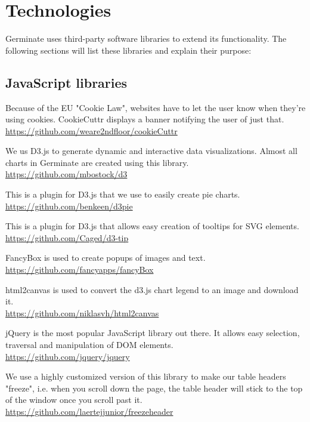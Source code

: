 \section{Technologies}
\label{sec:technologies}
Germinate uses third-party software libraries to extend its functionality. The following sections will list these libraries and explain their purpose:

\subsection{JavaScript libraries}

\begin{description}[align=left,style=nextline,leftmargin=*,labelsep=\parindent,font=\bfseries]
	\item[CookieCuttr] Because of the EU "Cookie Law", websites have to let the user know when they're using cookies. CookieCuttr displays a banner notifying the user of just that.\\\url{https://github.com/weare2ndfloor/cookieCuttr}
	\item[D3.js] We us D3.js to generate dynamic and interactive data visualizations. Almost all charts in Germinate are created using this library.\\\url{https://github.com/mbostock/d3}
	\item[d3Pie] This is a plugin for D3.js that we use to easily create pie charts.\\\url{https://github.com/benkeen/d3pie}
	\item[D3.tip] This is a plugin for D3.js that allows easy creation of tooltips for SVG elements.\\\url{https://github.com/Caged/d3-tip}
	\item[FancyBox] FancyBox is used to create popups of images and text. \\\url{https://github.com/fancyapps/fancyBox}
	\item[html2canvas] html2canvas is used to convert the d3.js chart legend to an image and download it.
	\\\url{https://github.com/niklasvh/html2canvas}
	\item[jQuery] jQuery is the most popular JavaScript library out there. It allows easy selection, traversal and manipulation of DOM elements. \\\url{https://github.com/jquery/jquery}
	\item[jQuery.freezeheader] We use a highly customized version of this library to make our table headers "freeze", i.e. when you scroll down the page, the table header will stick to the top of the window once you scroll past it. \\\url{https://github.com/laertejjunior/freezeheader}

\end{description}
